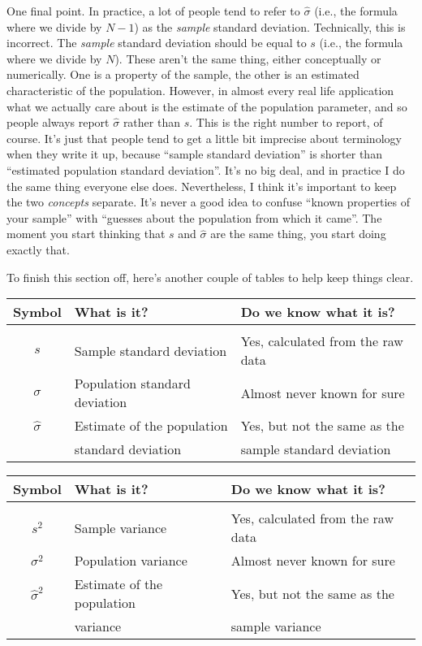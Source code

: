 One final point. In practice, a lot of people tend to refer to $\hat{\sigma}$ (i.e., the formula where we divide by $N-1$) as the {\it sample} standard deviation. Technically, this is incorrect. The {\it sample} standard deviation should be equal to $s$ (i.e., the formula where we divide by $N$). These aren't the same thing, either conceptually or numerically. One is a property of the sample, the other is an estimated characteristic of the population. However, in almost every real life application what we actually care about is the estimate of the population parameter, and so people always report $\hat\sigma$ rather than $s$. This is the right number to report, of course. It's just that people tend to get a little bit imprecise about terminology when they write it up, because ``sample standard deviation'' is shorter than ``estimated population standard deviation''. It's no big deal, and in practice I do the same thing everyone else does. Nevertheless, I think it's important to keep the two {\it concepts} separate. It's never a good idea to confuse ``known properties of your sample'' with ``guesses about the population from which it came''. The moment you start thinking that $s$ and $\hat\sigma$ are the same thing, you start doing exactly that. 

To finish this section off, here's another couple of tables to help keep things clear.

\begin{center}
\small 
\begin{tabular}{cll}
Symbol & What is it? & Do we know what it is? \\ \hline \\[-6pt]
$s$ & Sample standard deviation & Yes, calculated from the raw data \\
$\sigma$ & Population standard deviation & Almost never known for sure \\
$\hat{\sigma}$ & Estimate of the population  & Yes, but not the same as the  \\
 & standard deviation & sample standard deviation
\end{tabular}
\end{center}\vspace{0.5cm}

\begin{center}
\small 
\begin{tabular}{cll}
Symbol & What is it? & Do we know what it is? \\ \hline \\[-6pt]
$s^2$ & Sample variance & Yes, calculated from the raw data \\
$\sigma^2$ & Population variance & Almost never known for sure \\
$\hat{\sigma}^2$ & Estimate of the population  & Yes, but not the same as the  \\
 & variance & sample variance
\end{tabular}
\end{center}\vspace{0.5cm}


